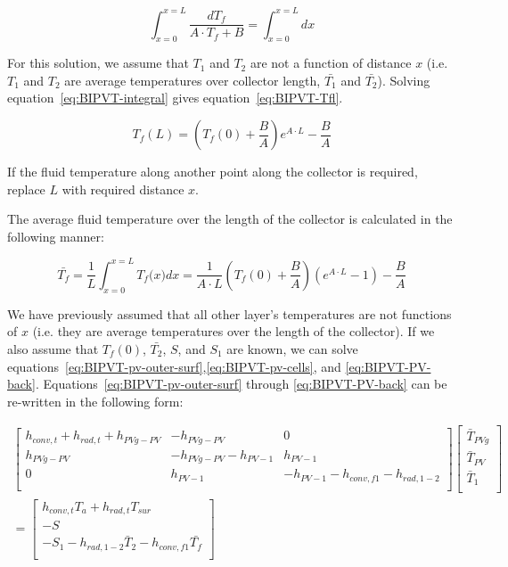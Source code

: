\begin{equation}
\int_{x=0}^{x=L}{\frac{dT_f}{{A\cdot T}_f+B}=\int_{x=0}^{x=L}dx}
\label{eq:BIPVT-integral}
\end{equation}

For this solution, we assume that \(T_{1}\) and \(T_{2}\) are not a function of distance \(x\) (i.e. \(T_{1}\) and \(T_{2}\) are average temperatures over collector length, \(\bar{T_{1}}\) and \(\bar{T_{2}}\)). Solving equation~\ref{eq:BIPVT-integral} gives equation~\ref{eq:BIPVT-Tfl}.

\begin{equation}
T_f(L)=\left(T_f(0)+\frac{B}{A}\right)e^{A\cdot L}-\frac{B}{A}
\label{eq:BIPVT-Tfl}
\end{equation}

If the fluid temperature along another point along the collector is required, replace \(L\) with required distance \(x\).

The average fluid temperature over the length of the collector is calculated in the following manner:

\begin{equation}
\bar{T_f}=\frac{1}{L}\int_{x=0}^{x=L}{T_f(x})dx=\frac{1}{A\cdot L}\left(T_f\left(0\right)+\frac{B}{A}\right)\left(e^{A\cdot L}-1\right)-\frac{B}{A}
\label{eq:BIPVT-tfl-avg}
\end{equation}

We have previously assumed that all other layer's temperatures are not functions of \(x\) (i.e. they are average temperatures over the length of the collector). If we also assume that \(T_{f}(0)\), \(\bar{T_{2}}\), \(S\), and \(S_{1}\) are known, we can solve equations~\ref{eq:BIPVT-pv-outer-surf},\ref{eq:BIPVT-pv-cells}, and \ref{eq:BIPVT-PV-back}. Equations~\ref{eq:BIPVT-pv-outer-surf} through \ref{eq:BIPVT-PV-back} can be re-written in the following form:

\begin{equation}
\begin{split}
\left[\begin{matrix}h_{conv,t}+h_{rad,t}+h_{PVg-PV}&-h_{PVg-PV}&0\\h_{PVg-PV}&-h_{PVg-PV}-h_{PV-1}&h_{PV-1}\\0&h_{PV-1}&-h_{PV-1}-h_{conv,f1}-h_{rad,1-2}\\\end{matrix}\right]\left[\begin{matrix}{\bar{T}}_{PVg}\\{\bar{T}}_{PV}\\{\bar{T}}_1\\\end{matrix}\right] \\
=\left[\begin{matrix}h_{conv,t}T_a+h_{rad,t}T_{sur}\\-S\\-S_1-h_{rad,1-2}{\bar{T}}_2-h_{conv,f1}\bar{T_f}\\\end{matrix}\right]
\end{split}
\label{eq:BIPVT-matrix}
\end{equation}

